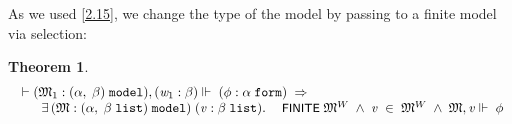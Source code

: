 \documentclass{llncs}
\newtheorem{thm}{Theorem}[chapter]
\newenvironment{holmath}{\begin{displaymath}\begin{array}{l}}{\end{array}\end{displaymath}\ignorespacesafterend}
\renewcommand{\HOLConst}[1]{{\textsf{\upshape\small #1}}}
\begin{document}
As we used \ref{2.15}, we change the type of the model by passing to a finite model via selection:
\begin{thm}
{\upshape\cite[Theorem 2.34 (Finite model property, via selection)]{Blackburn}}
\begin{holmath}
  \ensuremath{\HOLTokenTurnstile}(\HOLFreeVar{\ensuremath{\mathfrak{M}}}\sb{\mathrm{1}} :(\ensuremath{\alpha},\;\ensuremath{\beta})\;\HOLTyOp{model}),(\HOLFreeVar{w}\sb{\mathrm{1}} :\ensuremath{\beta})\ensuremath{\Vdash}\;(\HOLFreeVar{\ensuremath{\phi}} :\ensuremath{\alpha}\;\HOLTyOp{form})\;\HOLSymConst{\HOLTokenImp{}}\\
\;\;\;\;\;\;\;\HOLSymConst{\HOLTokenExists{}}(\HOLBoundVar{\ensuremath{\mathfrak{M}}} :(\ensuremath{\alpha},\;\ensuremath{\beta}\;\HOLTyOp{list})\;\HOLTyOp{model})\;(\HOLBoundVar{v} :\ensuremath{\beta}\;\HOLTyOp{list}).\;\HOLConst{FINITE}\;\HOLBoundVar{\ensuremath{\mathfrak{M}}}\HOLSymConst{\ensuremath{\sp{W}}}\;\HOLSymConst{\HOLTokenConj{}}\;\HOLBoundVar{v}\;\HOLSymConst{\HOLTokenIn{}}\;\HOLBoundVar{\ensuremath{\mathfrak{M}}}\HOLSymConst{\ensuremath{\sp{W}}}\;\HOLSymConst{\HOLTokenConj{}}\;\HOLBoundVar{\ensuremath{\mathfrak{M}}},\HOLBoundVar{v}\ensuremath{\Vdash}\;\HOLFreeVar{\ensuremath{\phi}}
\end{holmath}
\end{thm}
\end{document}

